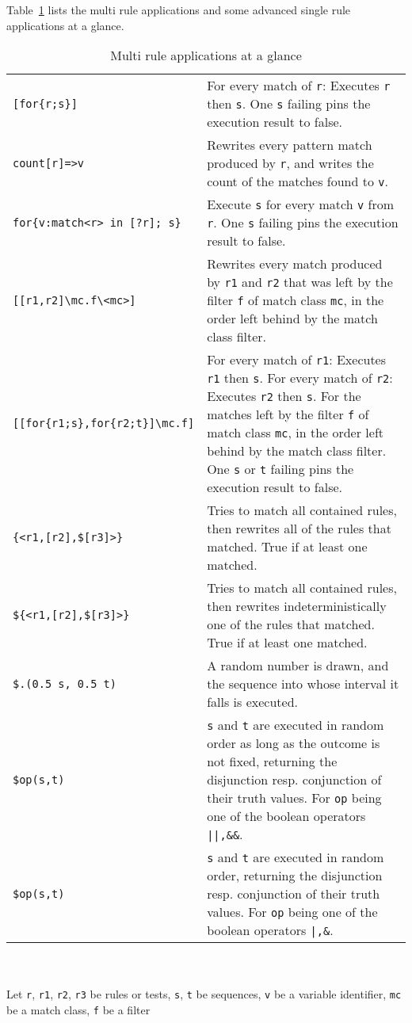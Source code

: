 Table~\ref{seqmultitab} lists the multi rule applications and some advanced single rule applications at a glance.

\begin{table}[htbp]
\begin{minipage}{\linewidth} \renewcommand{\footnoterule}{} 
\begin{tabularx}{\linewidth}{|lX|}
\hline
\texttt{[for\{r;s\}]} & For every match of \texttt{r}: Executes \texttt{r} then \texttt{s}. One \texttt{s} failing pins the execution result to false.\\
\texttt{count[r]=>v} & Rewrites every pattern match produced by \texttt{r}, and writes the count of the matches found to \texttt{v}.\\
\texttt{for\{v:match<r> in [?r]; s\}} & Execute \texttt{s} for every match \texttt{v} from \texttt{r}. One \texttt{s} failing pins the execution result to false.\\
\hline
\texttt{[[r1,r2]\textbackslash mc.f\textbackslash<mc>]} & Rewrites every match produced by \texttt{r1} and \texttt{r2} that was left by the filter \texttt{f} of match class \texttt{mc}, in the order left behind by the match class filter.\\
\texttt{[[for\{r1;s\},for\{r2;t\}]\textbackslash mc.f]} & For every match of \texttt{r1}: Executes \texttt{r1} then \texttt{s}. For every match of \texttt{r2}: Executes \texttt{r2} then \texttt{s}. For the matches left by the filter \texttt{f} of match class \texttt{mc}, in the order left behind by the match class filter. One \texttt{s} or \texttt{t} failing pins the execution result to false.\\
\hline
\texttt{\{<r1,[r2],\$[r3]>\}} & Tries to match all contained rules, then rewrites all of the rules that matched. True if at least one matched.\\
\texttt{\$\{<r1,[r2],\$[r3]>\}} & Tries to match all contained rules, then rewrites indeterministically one of the rules that matched. True if at least one matched.\\
\texttt{\$.(0.5 s, 0.5 t)} & A random number is drawn, and the sequence into whose interval it falls is executed.\\
\texttt{\$op(s,t)} & \texttt{s} and \texttt{t} are executed in random order as long as the outcome is not fixed, returning the disjunction resp. conjunction of their truth values. For \texttt{op} being one of the boolean operators \texttt{||,\&\&}.\\
\texttt{\$op(s,t)} & \texttt{s} and \texttt{t} are executed in random order, returning the disjunction resp. conjunction of their truth values. For \texttt{op} being one of the boolean operators \texttt{|,\&}.\\
\hline
\end{tabularx}\indexmain{\texttt{<>}}\indexmain{\texttt{<<;>>}}
\end{minipage}\\
\\ 
{\small Let \texttt{r}, \texttt{r1}, \texttt{r2}, \texttt{r3} be rules or tests, \texttt{s}, \texttt{t} be sequences, \texttt{v} be a variable identifier, \texttt{mc} be a match class, \texttt{f} be a filter }
\caption{Multi rule applications at a glance}
\label{seqmultitab}
\end{table}
